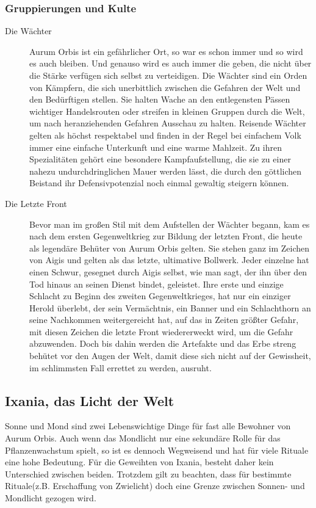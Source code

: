 \documentclass[a4paper,12pt,oneside]{book}
\begin{document}
\subsubsection{Gruppierungen und Kulte}
\begin{description}
\item[Die Wächter]
Aurum Orbis ist ein gefährlicher Ort, so war es schon immer und so wird es auch bleiben. Und genauso wird es auch immer die geben, die nicht über die Stärke verfügen sich selbst zu verteidigen. Die Wächter sind ein Orden von Kämpfern, die sich unerbittlich zwischen die Gefahren der Welt und den Bedürftigen stellen. Sie halten Wache an den entlegensten Pässen wichtiger Handelsrouten oder streifen in kleinen Gruppen durch die Welt, um nach heranziehenden Gefahren Ausschau zu halten. Reisende Wächter gelten als höchst respektabel und finden in der Regel bei einfachem Volk immer eine einfache Unterkunft und eine warme Mahlzeit. Zu ihren Spezialitäten gehört eine besondere Kampfaufstellung, die sie zu einer nahezu undurchdringlichen Mauer werden lässt, die durch den göttlichen Beistand ihr Defensivpotenzial noch einmal gewaltig steigern können.
\item[Die Letzte Front]
Bevor man im großen Stil mit dem Aufstellen der Wächter begann, kam es nach dem ersten Gegenweltkrieg zur Bildung der letzten Front, die heute als legendäre Behüter von Aurum Orbis gelten. Sie stehen ganz im Zeichen von Aigis und gelten als das letzte, ultimative Bollwerk. Jeder einzelne hat einen Schwur, gesegnet durch Aigis selbst, wie man sagt, der ihn über den Tod hinaus an seinen Dienst bindet, geleistet. Ihre erste und einzige Schlacht zu Beginn des zweiten Gegenweltkrieges, hat nur ein einziger Herold überlebt, der sein Vermächtnis, ein Banner und ein Schlachthorn an seine Nachkommen weitergereicht hat, auf das in Zeiten größter Gefahr, mit diesen Zeichen die letzte Front wiedererweckt wird, um die Gefahr abzuwenden. Doch bis dahin werden die Artefakte und das Erbe streng behütet vor den Augen der Welt, damit diese sich nicht auf der Gewissheit, im schlimmsten Fall errettet zu werden, ausruht.
\end{description}

\subsection{Ixania, das Licht der Welt}\label{Ixania}
Sonne und Mond sind zwei Lebenswichtige Dinge für fast alle Bewohner von Aurum Orbis. Auch wenn das Mondlicht nur eine sekundäre Rolle für das Pflanzenwachstum spielt, so ist es dennoch Wegweisend und hat für viele Rituale eine hohe Bedeutung. Für die Geweihten von Ixania, besteht daher kein Unterschied zwischen beiden. Trotzdem gilt zu beachten, dass für bestimmte Rituale(z.B. Erschaffung von Zwielicht) doch eine Grenze zwischen Sonnen- und Mondlicht gezogen wird. 
\end{document}
